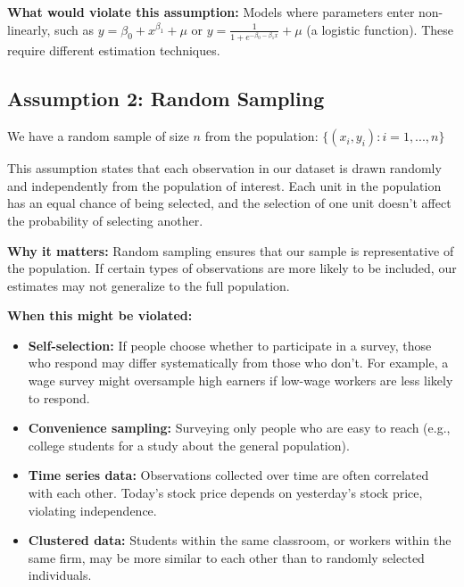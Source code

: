 \documentclass[
  letterpaper,
  DIV=11,
  numbers=noendperiod]{scrreprt}
\begin{document}
\textbf{What would violate this assumption:} Models where parameters
enter non-linearly, such as \(y = \beta_0 + x^{\beta_1} + \mu\) or
\(y = \frac{1}{1 + e^{-\beta_0 - \beta_1 x}} + \mu\) (a logistic
function). These require different estimation techniques.

\subsection{Assumption 2: Random
Sampling}\label{assumption-2-random-sampling}

\begin{tcolorbox}[enhanced jigsaw, arc=.35mm, bottomrule=.15mm, bottomtitle=1mm, breakable, colback=white, colbacktitle=quarto-callout-note-color!10!white, colframe=quarto-callout-note-color-frame, coltitle=black, left=2mm, leftrule=.75mm, opacityback=0, opacitybacktitle=0.6, rightrule=.15mm, title=\textcolor{quarto-callout-note-color}{\faInfo}\hspace{0.5em}{Gauss-Markov Assumption 2: Random Sampling}, titlerule=0mm, toprule=.15mm, toptitle=1mm]

We have a random sample of size \(n\) from the population:
\(\{(x_i, y_i): i = 1, ..., n\}\)

\end{tcolorbox}

This assumption states that each observation in our dataset is drawn
randomly and independently from the population of interest. Each unit in
the population has an equal chance of being selected, and the selection
of one unit doesn't affect the probability of selecting another.

\textbf{Why it matters:} Random sampling ensures that our sample is
representative of the population. If certain types of observations are
more likely to be included, our estimates may not generalize to the full
population.

\textbf{When this might be violated:}

\begin{itemize}
\item
  \textbf{Self-selection:} If people choose whether to participate in a
  survey, those who respond may differ systematically from those who
  don't. For example, a wage survey might oversample high earners if
  low-wage workers are less likely to respond.
\item
  \textbf{Convenience sampling:} Surveying only people who are easy to
  reach (e.g., college students for a study about the general
  population).
\item
  \textbf{Time series data:} Observations collected over time are often
  correlated with each other. Today's stock price depends on yesterday's
  stock price, violating independence.
\item
  \textbf{Clustered data:} Students within the same classroom, or
  workers within the same firm, may be more similar to each other than
  to randomly selected individuals.
\end{itemize}
\end{document}
